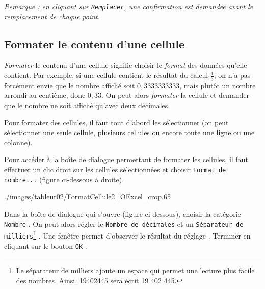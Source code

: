 \emph{Remarque : en cliquant sur \texttt{Remplacer}, une confirmation est demandée avant le remplacement de chaque point.}



\subsection{Formater le contenu d'une cellule}\label{Calc2FormaterCellule} 

\emph{Formater} le contenu d'une cellule signifie choisir le \emph{format} des données qu'elle contient. Par exemple, si une cellule contient le résultat du calcul $\frac{1}{3}$, on n'a pas forcément envie que le nombre affiché soit $0,3333333333$, mais plutôt un nombre arrondi au centième, donc $0,33$. On peut alors \emph{formater} la cellule et demander que le nombre ne soit affiché qu'avec deux décimales.

Pour formater des cellules, il faut tout d'abord les sélectionner (on peut sélectionner une seule cellule, plusieurs cellules ou encore toute une ligne ou une colonne).



Pour accéder à la boîte de dialogue permettant de formater les cellules, il faut effectuer un clic droit sur les cellules sélectionnées et choisir \texttt{Format de nombre...} (figure ci-dessous à droite).


%  
              {./images/tableur02/FormatCellule2_OExcel_crop}{.65\textwidth}

Dans la boîte de dialogue qui s'ouvre (figure ci-dessous), choisir la catégorie \texttt{Nombre} . On peut alors régler le \texttt{Nombre de décimales}  et un \texttt{Séparateur de milliers}\footnote{Le séparateur de milliers ajoute un espace qui permet une lecture plus facile des nombres. Ainsi, 19402445 sera écrit 19 402 445.} . Une fenêtre permet d'observer le résultat du réglage . Terminer en cliquant sur le bouton \texttt{OK} .


